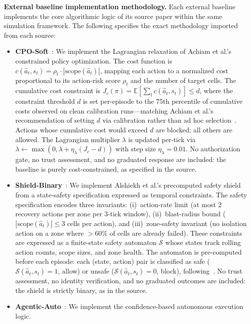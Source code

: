 \documentclass[10pt,journal,compsoc]{IEEEtran}
\begin{document}
\noindent\textbf{External baseline implementation methodology.}
Each external baseline implements the core algorithmic logic of its source paper within the same simulation framework.
The following specifies the exact methodology imported from each source:
\begin{itemize}
    \item \textbf{CPO-Soft}~\cite{achiam2017cpo}: We implement the Lagrangian relaxation of Achiam et al.'s constrained policy optimization.
    The cost function is $c(\hat{a}_t, s_t) = \rho_t \cdot |\mathrm{scope}(\hat{a}_t)|$, mapping each action to a normalized cost proportional to its action-risk score $\rho_t$ and the number of target cells.
    The cumulative cost constraint is $J_c(\pi) = \mathbb{E}[\sum_{t} c(\hat{a}_t, s_t)] \le d$, where the constraint threshold $d$ is set per-episode to the 75th percentile of cumulative costs observed on clean calibration runs---matching Achiam et al.'s recommendation of setting $d$ via calibration rather than ad hoc selection~\cite[Section~5.1]{achiam2017cpo}.
    Actions whose cumulative cost would exceed $d$ are blocked; all others are allowed.
    The Lagrangian multiplier $\lambda$ is updated per-tick via $\lambda \gets \max(0, \lambda + \eta_\lambda (J_c - d))$ with step size $\eta_\lambda = 0.01$.
    No authorization gate, no trust assessment, and no graduated response are included: the baseline is purely cost-constrained, as specified in the source.
    \item \textbf{Shield-Binary}~\cite{alshiekh2018shielding}: We implement Alshiekh et al.'s precomputed safety shield from a state-safety specification expressed as temporal constraints.
    The safety specification encodes three invariants: (i)~action-rate limit (at most 2 recovery actions per zone per 3-tick window), (ii)~blast-radius bound ($|\mathrm{scope}(\hat{a}_t)| \le 3$ cells per action), and (iii)~zone-safety invariant (no isolation action on a zone where $>60\%$ of cells are already failed).
    These constraints are expressed as a finite-state safety automaton $\mathcal{S}$ whose states track rolling action counts, scope sizes, and zone health.
    The automaton is pre-computed before each episode: each (state, action) pair is classified as safe ($\mathcal{S}(\hat{a}_t, s_t) = 1$, allow) or unsafe ($\mathcal{S}(\hat{a}_t, s_t) = 0$, block), following~\cite[Algorithm~1]{alshiekh2018shielding}.
    No trust assessment, no identity verification, and no graduated outcomes are included: the shield is strictly binary, as in the source.
    \item \textbf{Agentic-Auto}~\cite{toward_autonomous_oran_2026}: We implement the confidence-based autonomous execution logic.

\end{itemize}
\end{document}
